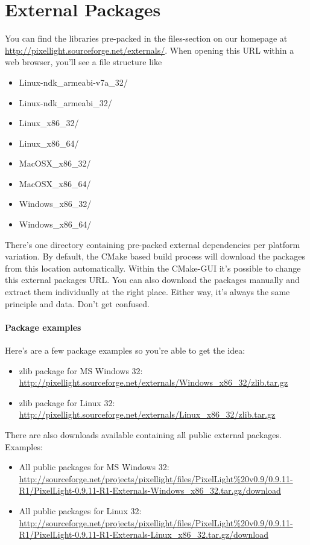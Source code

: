 \section{External Packages}
You can find the libraries pre-packed in the files-section on our homepage at \url{http://pixellight.sourceforge.net/externals/}. When opening this \ac{URL} within a web browser, you'll see a file structure like
\begin{itemize}
\item{Linux-ndk\_armeabi-v7a\_32/}
\item{Linux-ndk\_armeabi\_32/}
\item{Linux\_x86\_32/}
\item{Linux\_x86\_64/}
\item{MacOSX\_x86\_32/}
\item{MacOSX\_x86\_64/}
\item{Windows\_x86\_32/}
\item{Windows\_x86\_64/}
\end{itemize}
There's one directory containing pre-packed external dependencies per platform variation. By default, the CMake based build process will download the packages from this location automatically. Within the CMake-GUI it's possible to change this external packages \ac{URL}. You can also download the packages manually and extract them individually at the right place. Either way, it's always the same principle and data. Don't get confused.


\paragraph{Package examples}
Here's are a few package examples so you're able to get the idea:
\begin{itemize}
\item{zlib package for \ac{MS} Windows \SI{32}{\bit}: \url{http://pixellight.sourceforge.net/externals/Windows_x86_32/zlib.tar.gz}}
\item{zlib package for Linux \SI{32}{\bit}: \url{http://pixellight.sourceforge.net/externals/Linux_x86_32/zlib.tar.gz}}
\end{itemize}

There are also downloads available containing all public external packages. Examples:
\begin{itemize}
\item{All public packages for \ac{MS} Windows \SI{32}{\bit}: \url{http://sourceforge.net/projects/pixellight/files/PixelLight%20v0.9/0.9.11-R1/PixelLight-0.9.11-R1-Externals-Windows_x86_32.tar.gz/download}}
\item{All public packages for Linux \SI{32}{\bit}: \url{http://sourceforge.net/projects/pixellight/files/PixelLight%20v0.9/0.9.11-R1/PixelLight-0.9.11-R1-Externals-Linux_x86_32.tar.gz/download}}
\end{itemize}


